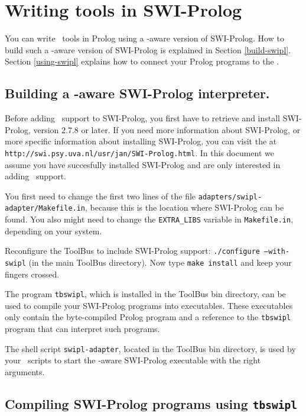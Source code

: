 
\section{\label{ToolsInSwipl}Writing tools in SWI-Prolog}

You can write \TB\ tools in Prolog using a \TB -aware version of
SWI-Prolog.
How to build such a \TB -aware version of SWI-Prolog is explained in
Section \ref{build-swipl}. Section \ref{using-swipl} explains how
to connect your Prolog programs to the \TB.

\subsection{\label{build-swipl}Building a \TB -aware SWI-Prolog interpreter.}

Before adding \TB\ support to SWI-Prolog, you first have to retrieve and
install SWI-Prolog, version 2.7.8 or later.
If you need more information about SWI-Prolog, or more
specific information about installing SWI-Prolog, you can visit the
 at 
{\tt http://swi.psy.uva.nl/usr/jan/SWI-Prolog.html}. In this document
we assume you have succesfully installed SWI-Prolog and are only interested
in adding \TB\ support.

You first need to change the first two lines of the file 
{\tt adapters/swipl-adapter/Makefile.in}, because this is the location
where SWI-Prolog can be found. You also might need to change the
{\tt EXTRA\_LIBS} variable in {\tt Makefile.in}, depending on your 
system.

Reconfigure the ToolBus to include
SWI-Prolog support: {\tt ./configure --with-swipl} (in the main ToolBus
directory).
Now type {\tt make install} and keep your fingers crossed.

The program {\tt tbswipl}, which is installed in the ToolBus bin
directory, can be used to compile your SWI-Prolog programs into
executables. These executables only contain the byte-compiled Prolog
program and a reference to the {\tt tbswipl} program that can interpret
such programs.

The shell script {\tt swipl-adapter}, located in the ToolBus bin directory,
is used by your \TB\ scripts to start
the \TB -aware SWI-Prolog executable with the right arguments. 

\subsection{\label{compiling-swipl}Compiling SWI-Prolog programs using
{\tt tbswipl}}


